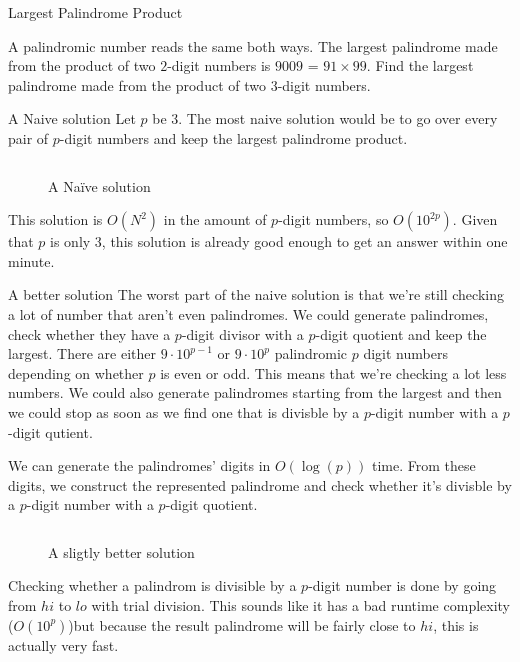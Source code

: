 \documentclass[main.tex]{subfiles}
\begin{document}
\begin{prob}{4}{Largest Palindrome Product}
  \begin{problem}
    A palindromic number reads the same both ways.
    The largest palindrome made from the product of two $2$-digit numbers is $9009$ = $91 \times 99$.
    Find the largest palindrome made from the product of two $3$-digit numbers.
  \end{problem}
  \begin{solutions}
    \begin{solution}{A Naive solution}
      Let $p$ be $3$.
      The most naive solution would be to go over every pair of $p$-digit numbers and keep the largest palindrome product.
      \begin{figure}[H]
        \inputminted[firstline=16, lastline=26]{c++}{\sol{004}{c++}/naive.cc}
        \caption{A Naïve solution}
      \end{figure}
      This solution is $O(N^2)$ in the amount of $p$-digit numbers, so $O(10^{2p})$.
      Given that $p$ is only $3$, this solution is already good enough to get an answer within one minute.
    \end{solution}

    \begin{solution}{A better solution}
      The worst part of the naive solution is that we're still checking a lot of number that aren't even palindromes.
      We could generate palindromes, check whether they have a $p$-digit divisor with a $p$-digit quotient and keep the largest.
      There are either $9\cdot 10^{p-1}$ or $9 \cdot 10^{p}$ palindromic $p$ digit numbers depending on whether $p$ is even or odd. \needed %
      This means that we're checking a lot less numbers.
      We could also generate palindromes starting from the largest and then we could stop as soon as we find one that is divisble by a $p$-digit number with a $p$-digit qutient.

      We can generate the palindromes' digits in $O(\log(p))$ time.
      From these digits, we construct the represented palindrome and check whether it's divisble by a $p$-digit number with a $p$-digit quotient.

      \begin{figure}[H]
        \inputminted[firstline=18, lastline=41]{c++}{\sol{004}{c++}/solution.cc}
        \caption{A sligtly better solution}
      \end{figure}

      Checking whether a palindrom is divisible by a $p$-digit number is done by going from $hi$ to $lo$ with trial division.
      This sounds like it has a bad runtime complexity ($O(10^{p})$)but because the result palindrome will be fairly close to $hi$, this is actually very fast.
    \end{solution}
  \end{solutions}
\end{prob}
\end{document}
